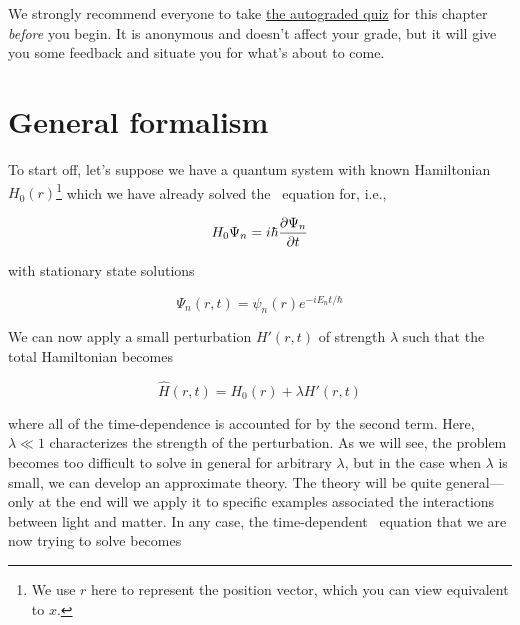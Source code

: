 \begin{tcolorbox}[colframe=PaloAlto, colbacktitle=PaloAlto!20!white, title=Pre-check quiz]
	We strongly recommend everyone to take \href{TODO}{the autograded quiz} for this chapter \emph{before} you begin.
	It is anonymous and doesn't affect your grade, but it will give you some feedback and situate you for what's about to come.
\end{tcolorbox}


\section{General formalism}
To start off, let's suppose we have a quantum system with known Hamiltonian $H_0(r)$\footnote{We use $r$ here to represent the position vector, which you can view equivalent to $x$.} which we have already solved the \Sch\ equation for, i.e.,

\begin{equation*}
	H_0\Psi_n = i\hbar \pdv{\Psi_n}{t}
\end{equation*}

\noindent with stationary state solutions

\begin{equation*}
	\Psi_n(r,t) = \psi_n(r)e^{-iE_nt/\hbar}
\end{equation*}

We can now apply a small perturbation $H'(r,t)$ of strength $\lambda$ such that the total Hamiltonian becomes 

\begin{tcolorbox}[title = Hamiltonian for small perturbations] \vspace{-2ex}
	\begin{equation}
	\hat{H}(r,t) = H_0(r) + \lambda H'(r,t) \label{eq:ham-pert}
	\end{equation}	
\end{tcolorbox}
	
where all of the time-dependence is accounted for by the second term. 
Here, $\lambda \ll 1$ characterizes the strength of the perturbation. 
As we will see, the problem becomes too difficult to solve in general for arbitrary $\lambda$, but in the case when $\lambda$ is small, we can develop an approximate theory. 
The theory will be quite general---only at the end will we apply it to specific examples associated the interactions between light and matter. 
In any case, the time-dependent \Sch\ equation that we are now trying to solve becomes

